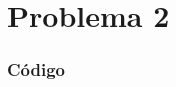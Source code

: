 \chapter{Problema 2}

\subsection*{Código}


\begin{lstlisting}[style=CStyle]
    
\end{lstlisting}
